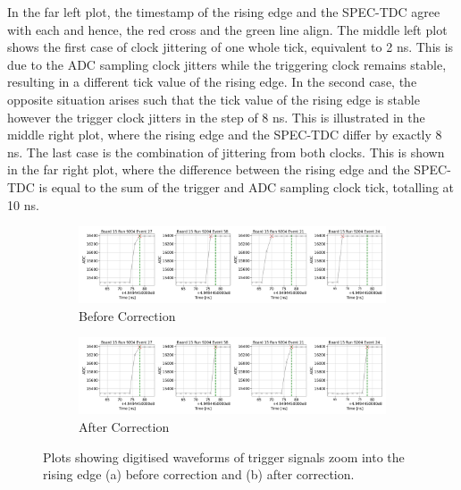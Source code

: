 In the far left plot, the timestamp of the rising edge and the SPEC-TDC agree with each and hence, the red cross and the green line align.
The middle left plot shows the first case of clock jittering of one whole tick, equivalent to 2 ns.
This is due to the ADC sampling clock jitters while the triggering clock remains stable, resulting in a different tick value of the rising edge.
In the second case, the opposite situation arises such that the tick value of the rising edge is stable however the trigger clock jitters in the step of 8 ns.
This is illustrated in the middle right plot, where the rising edge and the SPEC-TDC differ by exactly 8 ns. 
The last case is the combination of jittering from both clocks.
This is shown in the far right plot, where the difference between the rising edge and the SPEC-TDC is equal to the sum of the trigger and ADC sampling clock tick, totalling at 10 ns.

\begin{figure}[t!]
\begin{subfigure}[h]{1.00\linewidth}
\centering    
\includegraphics[width=\linewidth]{jitter_before}
\caption{Before Correction}
\label{subfig:jitter_before}
\end{subfigure}
\vspace{0.5cm}
\begin{subfigure}[h]{1.00\linewidth}
\centering    
\includegraphics[width=\linewidth]{jitter_after}
\caption{After Correction}
\label{subfig:jitter_after}
\end{subfigure}%

\caption[Clock Jitterin Cases]{
Plots showing digitised waveforms of trigger signals zoom into the rising edge (a) before correction and (b) after correction.
}
\label{fig:jitterCorr}
\end{figure}

